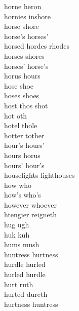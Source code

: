 horne heron\\
hornies inshore\\
horse shore\\
horse's horses'\\
horsed hordes rhodes\\
horses shores\\
horses' horse's\\
horus hours\\
hose shoe\\
hoses shoes\\
host thos shot\\
hot oth\\
hotel thole\\
hotter tother\\
hour's hours'\\
hours horus\\
hours' hour's\\
houselights lighthouses\\
how who\\
how's who's\\
however whoever\\
htengier reigneth\\
hug ugh\\
huk kuh\\
hums mush\\
huntress hurtness\\
hurdle hurled\\
hurled hurdle\\
hurt ruth\\
hurted dureth\\
hurtness huntress\\

